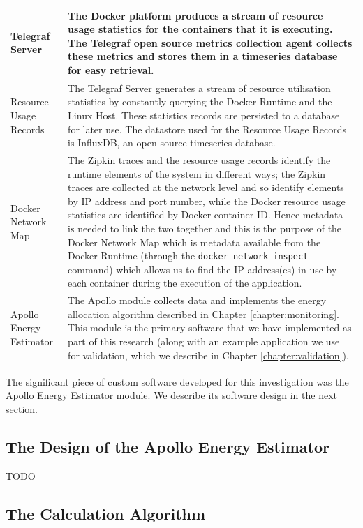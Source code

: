 \begin{table}
\begin{tabular}{|l|p{10cm}|}
\hline
Telegraf Server & The Docker platform produces a stream of resource usage statistics for the containers that it is executing.  The Telegraf open source metrics collection agent collects these metrics and stores them in a timeseries database for easy retrieval. \\
\hline
Resource Usage Records & The Telegraf Server generates a stream of resource utilisation statistics by constantly querying the Docker Runtime and the Linux Host.  These statistics records are persisted to a database for later use.  The datastore used for the Resource Usage Records is InfluxDB, an open source timeseries database. \\
\hline
Docker Network Map & The Zipkin traces and the resource usage records identify the runtime elements of the system in different ways; the Zipkin traces are collected at the network level and so identify elements by IP address and port number, while the Docker resource usage statistics are identified by Docker container ID.  Hence metadata is needed to link the two together and this is the purpose of the Docker Network Map which is metadata available from the Docker Runtime (through the \texttt{docker network inspect} command) which allows us to find the IP address(es) in use by each container during the execution of the application. \\
\hline
Apollo Energy Estimator & The Apollo module collects data and implements the energy allocation algorithm described in Chapter \ref{chapter:monitoring}.  This module is the primary software that we have implemented as part of this research (along with an example application we use for validation, which we describe in Chapter \ref{chapter:validation}). \\
\hline
\end{tabular}
\end{table}

The significant piece of custom software developed for this investigation was the Apollo Energy Estimator module.  We describe its software design in the next section.

\subsection{The Design of the Apollo Energy Estimator}

TODO




\subsection{The Calculation Algorithm}

